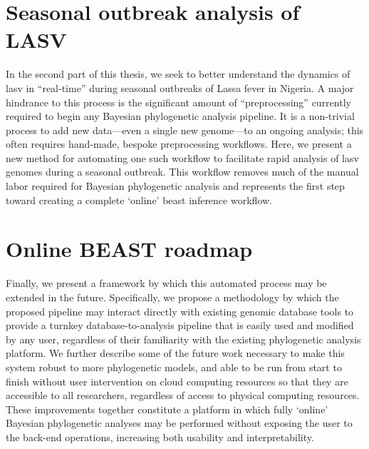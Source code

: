 \section{Seasonal outbreak analysis of LASV}

In the second part of this thesis, we seek to better understand the dynamics of \gls{lasv} in ``real-time'' during seasonal outbreaks of Lassa fever in Nigeria.
A major hindrance to this process is the significant amount of ``preprocessing'' currently required to begin any Bayesian phylogenetic analysis pipeline.
It is a non-trivial process to add new data---even a single new genome---to an ongoing analysis; this often requires hand-made, bespoke preprocessing workflows.
Here, we present a new method for automating one such workflow to facilitate rapid analysis of \gls{lasv} genomes during a seasonal outbreak.
This workflow removes much of the manual labor required for Bayesian phylogenetic analysis and represents the first step toward creating a complete `online' \gls{beast} inference workflow.


\section{Online BEAST roadmap}

Finally, we present a framework by which this automated process may be extended in the future.
Specifically, we propose a methodology by which the proposed pipeline may interact directly with existing genomic database tools to provide a turnkey database-to-analysis pipeline that is easily used and modified by any user, regardless of their familiarity with the existing phylogenetic analysis platform.
We further describe some of the future work necessary to make this system robust to more phylogenetic models, and able to be run from start to finish without user intervention on cloud computing resources so that they are accessible to all researchers, regardless of access to physical computing resources.
These improvements together constitute a platform in which fully `online' Bayesian phylogenetic analyses may be performed without exposing the user to the back-end operations, increasing both usability and interpretability.


\cleardoublepage

